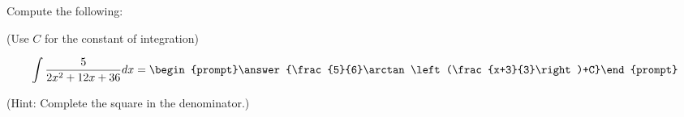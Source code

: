 \documentclass{ximera}
\author{Jim Talamo}
\begin{document}
\begin{exercise}
Compute the following:

\begin{prompt} (Use $C$ for the constant of integration) \end{prompt}

\[
\int \frac{5}{2x^2+12x+36} dx =
\begin{prompt}\answer{\frac{5}{6}\arctan\left(\frac{x+3}{3}\right)+C}\end{prompt} \\
\]

\begin{prompt} (Hint: Complete the square in the denominator.) \end{prompt}
\end{exercise}
\end{document}
